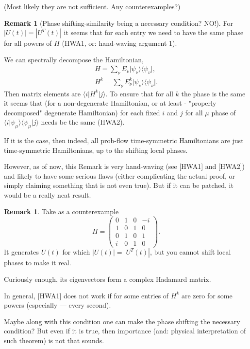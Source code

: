 \documentclass[aps,pra,12pt,nofootinbib,superscriptaddress,longbibliography,showpacs]{revtex4-1}
\theoremstyle{plain}
\theoremstyle{definition}
\newtheorem{remark}[theorem]{Remark}
\newcommand{\bra}[1]{\mbox{$\langle #1|$}}
\newcommand{\ket}[1]{\ensuremath{|#1\rangle}}
\newcommand{\braket}[2]{\mbox{$\langle #1|#2\rangle$}}
\begin{document}
(Most likely they are not sufficient. Any counterexamples?)

\begin{remark}[Phase shifting-similarity being a necessary condition? NO!]
\label{rmk:phase-relabeling}
For $|U(t)| = |U^T(t)|$ it seems that for each entry we need to have the same phase for all powers of $H$ (HWA1, or: hand-waving argument 1).

We can spectrally decompose the Hamiltonian,
\begin{align}
H = \sum_\nu E_\nu \ket{\psi_\nu}\bra{\psi_\nu},\\
H^k = \sum_\nu E_\nu^k \ket{\psi_\nu}\bra{\psi_\nu}.
\end{align}
Then matrix elements are $\bra{i} H^k \ket{j}$. To ensure that for all $k$ the phase is the same it seems that (for a non-degenerate Hamiltonian, or at least - "properly decomposed" degenerate Hamiltonian) for each fixed $i$ and $j$ for all $\mu$ phase of $\braket{i}{\psi_\mu}\braket{\psi_\mu}{j}$ needs be the same (HWA2).

If it is the case, then indeed, all prob-flow time-symmetric Hamiltonians are just time-symmetric Hamiltonians, up to the shifting local phases. 

However, as of now, this Remark is very hand-waving (see [HWA1] and [HWA2]) and likely to have some serious flaws (either complicating the actual proof, or simply claiming something that is not even true). But if it can be patched, it would be a really neat result.

\begin{remark}
Take as a counterexample
\begin{equation}
H = 
\begin{pmatrix}
0 & 1 & 0 & -i\\
1 & 0 & 1 & 0\\
0 & 1 & 0 & 1\\
i & 0 & 1 & 0
\end{pmatrix}.
\end{equation}
It generates $U(t)$ for which $|U(t)| = |U^T(t)|$, but you cannot shift local phases to make it real.

Curiously enough, its eigenvectors form a complex Hadamard matrix.

In general, [HWA1] does not work if for some entries of $H^k$ are zero for some powers (especially --- every second).

Maybe along with this condition one can make the phase shifting the necessary condition?
But even if it is true, then importance (and: physical interpretation of such theorem) is not that sounds.

\end{remark}


\end{remark}
\end{document}
